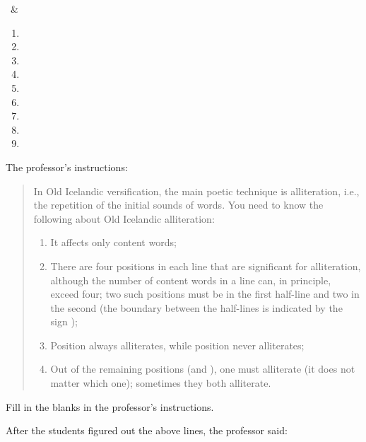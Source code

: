 \begin{refsection}
\begin{problem}{\langnameOldNorse}{\namePArkadiev\ \& \nameEGurevich}{}
\begin{enumerate}[label = A\arabic*., leftmargin = 1in]
    \item {}
    \item {}
    \item {}
    \item {}
    \item {}
    \item {}
    \item {}
    \item {}
    \item {}
\end{enumerate}

The professor's instructions:
\begin{quote}
    In Old Icelandic versification, the main poetic technique is alliteration, i.e., the repetition of the initial sounds of words. You need to know the following about Old Icelandic alliteration:
    
    \begin{enumerate}
        \item It affects only content words;
        \item There are four positions in each line that are significant for alliteration, although the number of content words in a line can, in principle, exceed four; two such positions must be in the first half-line and two in the second (the boundary between the half-lines is indicated by the sign \cmubdata{|});
        \item Position \pbblank always alliterates, while position \pbblank never alliterates;
        \item Out of the remaining positions (\pbblank and \pbblank), one must alliterate (it does not matter which one); sometimes they both alliterate. 
    \end{enumerate}
\end{quote}

\begin{assgts}
\item Fill in the blanks in the professor's instructions.

After the students figured out the above lines, the professor said:


\end{assgts}
\end{problem}
\end{refsection}
